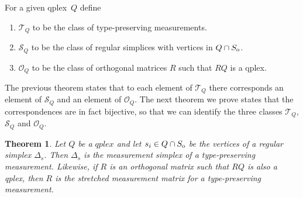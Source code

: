 \documentclass[aps,pra,superscriptaddress,10pt,tightenlines,twocolumn,nofootinbib]{revtex4}
\newtheorem{theorem}{Theorem}
\theoremstyle{remark}
\newcommand{\so}{S_{\rm{o}}}
\newcommand{\qp}{Q}
\newcommand{\qplex}{qplex}
\newcommand{\typ}[1]{\mathcal{T}_{#1}}
\newcommand{\sym}[1]{\mathcal{S}_{#1}}
\newcommand{\ort}[1]{\mathcal{O}_{#1}}
\begin{document}
For a given \qplex\ $\qp$ define
\begin{enumerate}
\item $\typ{\qp}$ to be the class of type-preserving measurements.
\item $\sym{\qp}$ to be the class of regular simplices with vertices in $\qp\cap \so$.
\item $\ort{\qp}$ to be the class of orthogonal matrices $R$ such that $R\qp$ is a \qplex.
\end{enumerate}
The previous theorem states that to each element of $\typ{\qp}$ there corresponds an element of $\sym{\qp}$ and an element of $\ort{\qp}$.  The next theorem we prove states that the  correspondences are in fact bijective, so that we can identify the three classes $\typ{\qp}$, $\sym{\qp}$ and $\ort{\qp}$.
\begin{theorem}
\label{thm:RegSimpIsTPreserve}
Let $\qp$ be a $\qplex$ and let $s_i\in \qp\cap \so$ be the vertices of a regular simplex $\Delta_s$.  Then  $\Delta_s$ is the measurement simplex of a type-preserving measurement.  Likewise, if $R$ is an orthogonal matrix such that $R\qp$ is also a qplex, then $R$ is the stretched measurement matrix for a type-preserving measurement.
\end{theorem}
\end{document}
